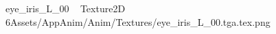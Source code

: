 
   eye_iris_L_00             	   Texture2D
   6   Assets/AppAnim/Anim/Textures/eye_iris_L_00.tga.tex.png